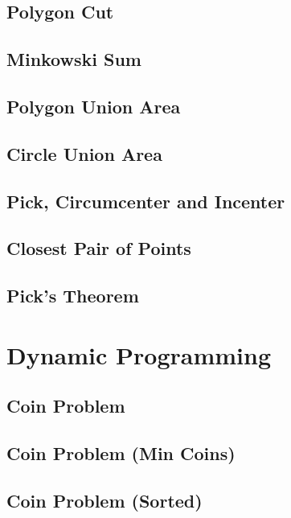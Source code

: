 \documentclass[10pt,letterpaper,landscape,twocolumn]{article}
\begin{document}
\subsection{Polygon Cut}

\subsection{Minkowski Sum}

\subsection{Polygon Union Area}

\subsection{Circle Union Area}

\subsection{Pick, Circumcenter and Incenter}


\subsection{Closest Pair of Points}

\subsection{Pick's Theorem}


\section{Dynamic Programming}
\subsection{Coin Problem}

\subsection{Coin Problem (Min Coins)}

\subsection{Coin Problem (Sorted)}

\end{document}
